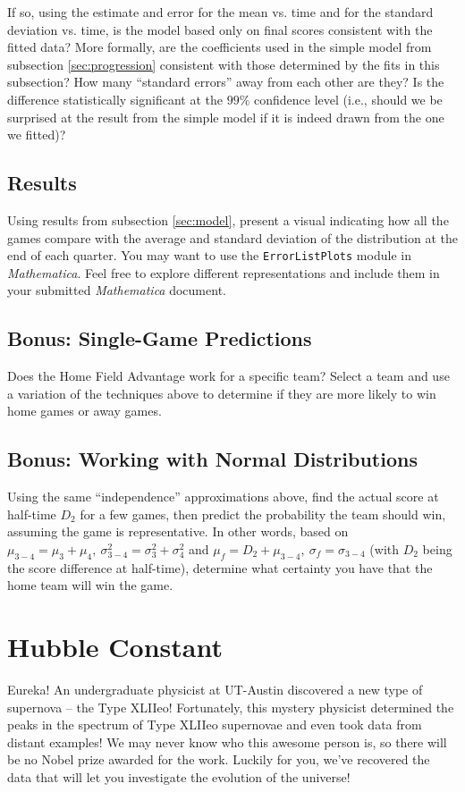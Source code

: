 \documentclass{article}
\begin{document}
If so, using the estimate and error for the mean vs. time and for the standard deviation vs. time,
is the model based only on final scores consistent with the fitted data? More formally, are the coefficients used in the simple model from subsection \ref{sec:progression} consistent
with those determined by the fits in this subsection? How many ``standard errors'' away from each other are they? Is the difference statistically significant at the 
$99\%$ confidence level (i.e., should we be
surprised at the result from the simple model if it is indeed drawn from the one we fitted)?

\subsection{Results}
Using results from subsection \ref{sec:model}, present a visual indicating how all the games compare with the average and standard deviation of the distribution at the end of each quarter. You
may want to use the \texttt{ErrorListPlots} module in \textit{Mathematica}. Feel free to explore different representations and include them in your submitted \textit{Mathematica} document.

\subsection{Bonus: Single-Game Predictions}
Does the Home Field Advantage work for a specific team? Select a team and use a variation of the techniques above to determine if they are more likely to win home games or away games.

\subsection{Bonus: Working with Normal Distributions}
Using the same ``independence'' approximations above, find the actual score at half-time $D_2$ for a few games, then predict the probability the team should win, assuming the
game is representative. In other words, based on $\mu_{3-4}=\mu_3+\mu_4,~\sigma_{3-4}^2=\sigma_3^2+\sigma_4^2$ and $\mu_{f}=D_2+\mu_{3-4},~\sigma_f=\sigma_{3-4}$ (with
$D_2$ being the score difference at half-time), determine what certainty you have that the home team will win the game. 

\section{Hubble Constant}
Eureka! An undergraduate physicist at UT-Austin discovered a new type of supernova -- the Type XLIIeo! Fortunately, this
mystery physicist determined the peaks in the spectrum of Type XLIIeo supernovae and even took data from
distant examples! We may never know who this awesome person is, so there will be no Nobel prize awarded for the work.
Luckily for you, we've recovered the data that will let you investigate the evolution of the universe!
\end{document}
